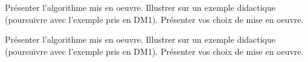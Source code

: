 

%
%

\vspace{5mm}
\noindent
{}
\vspace{2mm}

\noindent
Présenter l'algorithme mis en oeuvre. Illustrer sur un exemple didactique (poursuivre avec l'exemple pris en DM1). Présenter vos choix de mise en oeuvre.

%
%

\vspace{5mm}
\noindent
{}
\vspace{2mm}

\noindent
Présenter l'algorithme mis en oeuvre. Illustrer sur un exemple didactique (poursuivre avec l'exemple pris en DM1). Présenter vos choix de mise en oeuvre.

%
%

\vspace{5mm}
\noindent
{}
\vspace{2mm}

